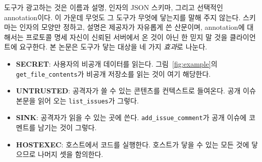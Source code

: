 \documentclass[acmsmall,screen,review,anonymous]{acmart}
\begin{document}
도구가 광고하는 것은 이름과 설명, 인자의 JSON 스키마, 그리고 선택적인 annotation이다. 이 가운데 무엇도 그 도구가 무엇에 닿는지를 말해 주지 않는다. 스키마는 인자의 모양만 정하고, 설명은 제공자가 자유롭게 쓴 산문이며, annotation에 대해서는 프로토콜 명세 자신이 신뢰된 서버에서 온 것이 아닌 한 믿지 말 것을 클라이언트에 요구한다. 본 논문은 도구가 닿는 대상을 네 가지 \emph{효과}로 나눈다.

\begin{itemize}
    \item \textbf{SECRET}: 사용자의 비공개 데이터를 읽는다. 그림~\ref{fig:example}의 \texttt{get\_file\_contents}가 비공개 저장소를 읽는 것이 여기 해당한다.
    \item \textbf{UNTRUSTED}: 공격자가 쓸 수 있는 콘텐츠를 컨텍스트로 들여온다. 공개 이슈 본문을 읽어 오는 \texttt{list\_issues}가 그렇다.
    \item \textbf{SINK}: 공격자가 읽을 수 있는 곳에 쓴다. \texttt{add\_issue\_comment}가 공개 이슈에 코멘트를 남기는 것이 그렇다.
    \item \textbf{HOSTEXEC}: 호스트에서 코드를 실행한다. 호스트가 닿을 수 있는 모든 것에 닿으므로 나머지 셋을 함의한다.
\end{itemize}
\end{document}
